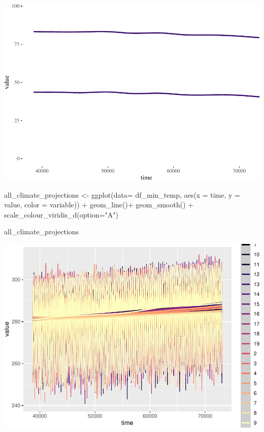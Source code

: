 \documentclass[
  paper=a4,
  ,captions=tableheading
]{scrartcl}
\newenvironment{Shaded}{\begin{snugshade}}{\end{snugshade}}
\newcommand{\AttributeTok}[1]{\textcolor[rgb]{0.77,0.63,0.00}{#1}}
\newcommand{\FunctionTok}[1]{\textcolor[rgb]{0.00,0.00,0.00}{#1}}
\newcommand{\NormalTok}[1]{#1}
\newcommand{\OtherTok}[1]{\textcolor[rgb]{0.56,0.35,0.01}{#1}}
\newcommand{\SpecialCharTok}[1]{\textcolor[rgb]{0.00,0.00,0.00}{#1}}
\newcommand{\StringTok}[1]{\textcolor[rgb]{0.31,0.60,0.02}{#1}}
\begin{document}
\includegraphics{Haskell_files/figure-latex/unnamed-chunk-50-1.pdf}

\begin{Shaded}
\begin{Highlighting}[]
\NormalTok{all\_climate\_projections }\OtherTok{\textless{}{-}} \FunctionTok{ggplot}\NormalTok{(}\AttributeTok{data=}\NormalTok{ df\_min\_temp, }\FunctionTok{aes}\NormalTok{(}\AttributeTok{x =}\NormalTok{ time, }\AttributeTok{y =}\NormalTok{ value, }\AttributeTok{color =}\NormalTok{ variable)) }\SpecialCharTok{+} 
  \FunctionTok{geom\_line}\NormalTok{()}\SpecialCharTok{+}
  \FunctionTok{geom\_smooth}\NormalTok{() }\SpecialCharTok{+}
  \FunctionTok{scale\_colour\_viridis\_d}\NormalTok{(}\AttributeTok{option=}\StringTok{"A"}\NormalTok{)}
  

\NormalTok{all\_climate\_projections}
\end{Highlighting}
\end{Shaded}

\includegraphics{Haskell_files/figure-latex/unnamed-chunk-51-1.pdf}
\end{document}
